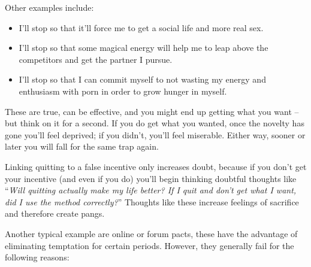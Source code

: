 \documentclass[
]{book}
\begin{document}
Other examples include:

\begin{itemize}
\item
  I'll stop so that it'll force me to get a social life and more real sex.
\item
  I'll stop so that some magical energy will help me to leap above the competitors and get the partner I pursue.
\item
  I'll stop so that I can commit myself to not wasting my energy and enthusiasm with porn in order to grow hunger in myself.
\end{itemize}

These are true, can be effective, and you might end up getting what you want -- but think on it for a second. If you do get what you wanted, once the novelty has gone you'll feel deprived; if you didn't, you'll feel miserable. Either way, sooner or later you will fall for the same trap again.

Linking quitting to a false incentive only increases doubt, because if you don't get your incentive (and even if you do) you'll begin thinking doubtful thoughts like ``\emph{Will quitting actually make my life better? If I quit and don't get what I want, did I use the method correctly?}'' Thoughts like these increase feelings of sacrifice and therefore create pangs.

Another typical example are online or forum pacts, these have the advantage of eliminating temptation for certain periods. However, they generally fail for the following reasons:
\end{document}
